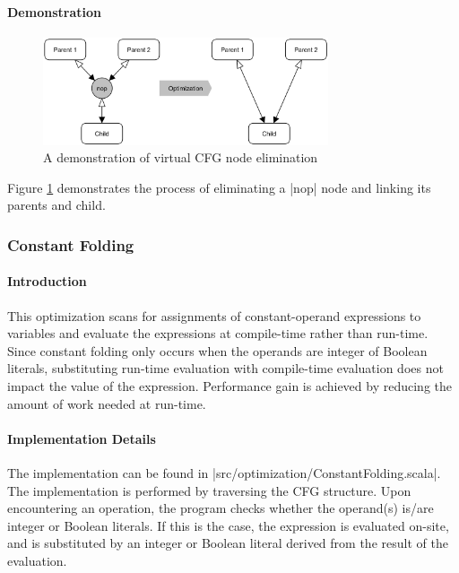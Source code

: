 \paragraph{Demonstration}
\begin{figure}[ht]
    \centering
    \includegraphics[width=0.75\textwidth]{img/virtual-cfg-node-elimination}
    \caption{A demonstration of virtual CFG node elimination}
    \label{fig:virtual-cfg-node-elimination}
\end{figure}
Figure \ref{fig:virtual-cfg-node-elimination} demonstrates the process of eliminating a |nop| node and linking its parents and child.


\subsubsection{Constant Folding}

\paragraph{Introduction}

This optimization scans for assignments of constant-operand expressions to variables and evaluate the expressions at compile-time rather than run-time. Since constant folding only occurs when the operands are integer of Boolean literals, substituting run-time evaluation with compile-time evaluation does not impact the value of the expression. Performance gain is achieved by reducing the amount of work needed at run-time.

\paragraph{Implementation Details}

The implementation can be found in |src/optimization/ConstantFolding.scala|. The implementation is performed by traversing the CFG structure. Upon encountering an operation, the program checks whether the operand(s) is/are integer or Boolean literals. If this is the case, the expression is evaluated on-site, and is substituted by an integer or Boolean literal derived from the result of the evaluation.

